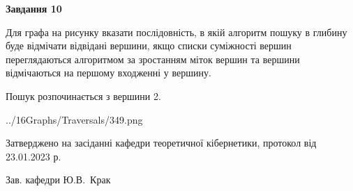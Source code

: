 \documentclass[12pt, ukrainian]{article}
\begin{document}
{\begin {large}
{\begin {center}\textbf{Завдання 10}\end {center}}\par
Для графа на рисунку вказати послідовність, в якій алгоритм пошуку в глибину буде відмічати відвідані вершини, якщо списки суміжності вершин переглядаються алгоритмом за зростанням міток вершин та вершини відмічаються на першому вход\-женні у вершину.\par
Пошук розпочинається з вершини 2.\par

\begin{center}
	{../16Graphs/Traversals/349.png}
\end{center}\par
\newpage


\end {large}
}
{\smallskip \begin {small} Затверджено на засіданні кафедри теоретичної кібернетики, протокол  від   23.01.2023 р.\par\smallskip\smallskip
{\parbox {6.5 cm}{Зав. кафедри \dotfill Ю.В.~Крак}} \end{small}}
\end{document}
